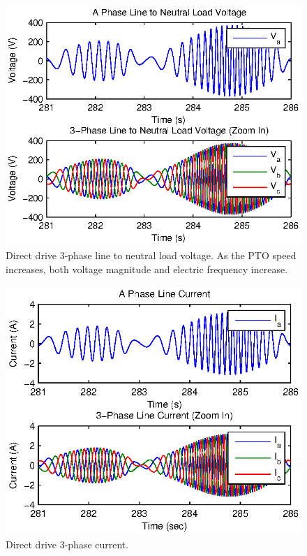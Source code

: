 \documentclass[twocolumn,10pt]{asme2e}
\begin{document}
\begin{figure}[t]
    \centering
    \includegraphics[width=1\columnwidth]{Images/DDVabc}
    \caption{Direct drive 3-phase line to neutral load voltage. As the PTO speed increases, both voltage magnitude and electric frequency increase.}
    \label{voltage}
    \end{figure}

\begin{figure}[t]
    \centering
    \includegraphics[width=1\columnwidth]{Images/DDIabcZoom}
    \caption{Direct drive 3-phase current.}
    \label{current}
    \end{figure}
\end{document}
